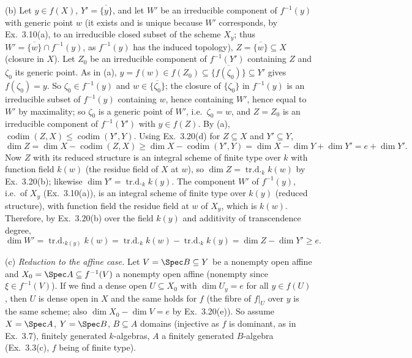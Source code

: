 \documentclass[11pt]{article}
\begin{document}
(b) Let $y\in f(X)$, $Y'=\overline{\{y\}}$, and let $W'$ be an irreducible component of $f^{-1}(y)$ with generic point $w$ (it exists and is unique because $W'$ corresponds, by Ex.~3.10(a), to an irreducible closed subset of the scheme $X_y$; thus $W'=\overline{\{w\}}\cap f^{-1}(y)$, as $f^{-1}(y)$ has the induced topology), $Z=\overline{\{w\}}\subseteq X$ (closure in $X$). Let $Z_0$ be an irreducible component of $f^{-1}(Y')$ containing $Z$ and $\zeta_0$ its generic point. As in (a), $y=f(w)\in f(Z_0)\subseteq\overline{\{f(\zeta_0)\}}\subseteq Y'$ gives $f(\zeta_0)=y$. So $\zeta_0\in f^{-1}(y)$ and $w\in\overline{\{\zeta_0\}}$; the closure of $\{\zeta_0\}$ in $f^{-1}(y)$ is an irreducible subset of $f^{-1}(y)$ containing $w$, hence containing $W'$, hence equal to $W'$ by maximality; so $\zeta_0$ is a generic point of $W'$, i.e.\ $\zeta_0=w$, and $Z=Z_0$ is an irreducible component of $f^{-1}(Y')$ with $y\in f(Z)$. By (a), $\operatorname{codim}(Z,X)\le\operatorname{codim}(Y',Y)$. Using Ex.~3.20(d) for $Z\subseteq X$ and $Y'\subseteq Y$,
\[\dim Z=\dim X-\operatorname{codim}(Z,X)\ge\dim X-\operatorname{codim}(Y',Y)=\dim X-\dim Y+\dim Y'=e+\dim Y'.\]
Now $Z$ with its reduced structure is an integral scheme of finite type over $k$ with function field $k(w)$ (the residue field of $X$ at $w$), so $\dim Z=\operatorname{tr.d.}_kk(w)$ by Ex.~3.20(b); likewise $\dim Y'=\operatorname{tr.d.}_kk(y)$. The component $W'$ of $f^{-1}(y)$, i.e.\ of $X_y$ (Ex.~3.10(a)), is an integral scheme of finite type over $k(y)$ (reduced structure), with function field the residue field at $w$ of $X_y$, which is $k(w)$. Therefore, by Ex.~3.20(b) over the field $k(y)$ and additivity of transcendence degree,
\[\dim W'=\operatorname{tr.d.}_{k(y)}k(w)=\operatorname{tr.d.}_kk(w)-\operatorname{tr.d.}_kk(y)=\dim Z-\dim Y'\ge e.\]

(c) \emph{Reduction to the affine case.} Let $V=\Spec B\subseteq Y$ be a nonempty open affine and $X_0=\Spec A\subseteq f^{-1}(V)$ a nonempty open affine (nonempty since $\xi\in f^{-1}(V)$). If we find a dense open $U\subseteq X_0$ with $\dim U_y=e$ for all $y\in f(U)$, then $U$ is dense open in $X$ and the same holds for $f$ (the fibre of $f|_U$ over $y$ is the same scheme; also $\dim X_0-\dim V=e$ by Ex.~3.20(e)). So assume $X=\Spec A$, $Y=\Spec B$, $B\subseteq A$ domains (injective as $f$ is dominant, as in Ex.~3.7), finitely generated $k$-algebras, $A$ a finitely generated $B$-algebra (Ex.~3.3(c), $f$ being of finite type).
\end{document}
